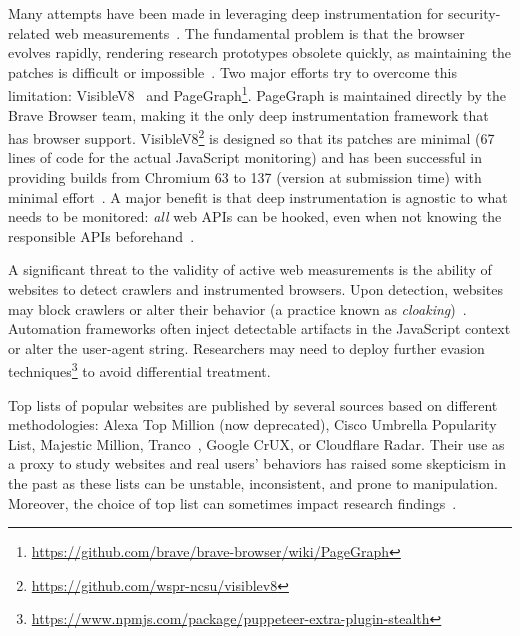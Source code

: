  Many attempts have been made in leveraging deep instrumentation for security-related web measurements~\cite{neasbittWebCapsuleLightweightForensic2015,liJSgraphEnablingReconstruction2018, acarFPDetectiveDustingWeb2013, IncontextStoreIncontext1998, chenMystiqueUncoveringInformation2018}. The fundamental problem is that the browser evolves rapidly, rendering research prototypes obsolete quickly, as maintaining the patches is difficult or impossible~\cite{chenMystiqueUncoveringInformation2018}.  
Two major efforts try to overcome this limitation: VisibleV8~\cite{jueckstockVisibleV8InbrowserMonitoring2019} and PageGraph\footnote{\url{https://github.com/brave/brave-browser/wiki/PageGraph}}.
%
PageGraph is maintained directly by the Brave Browser team, making it the only deep instrumentation framework that has browser support. 
%
VisibleV8\footnote{\url{https://github.com/wspr-ncsu/visiblev8}} is designed so that its patches are minimal (67 lines of code for the actual JavaScript monitoring) and has been successful in providing builds from Chromium 63 to 137 (version at submission time) with minimal effort~\cite{ jueckstockVisibleV8InbrowserMonitoring2019}. A major benefit is that deep instrumentation is agnostic to what needs to be monitored: \textit{all} web APIs can be hooked, even when not knowing the responsible APIs beforehand~\cite{suAutomaticDiscoveryEmerging2023}.

A significant threat to the validity of active web measurements is the ability of websites to detect crawlers and instrumented browsers. Upon detection, websites may block crawlers or alter their behavior (a practice known as \textit{cloaking})~\cite{invernizzi2016cloak}. Automation frameworks often inject detectable artifacts in the JavaScript context or alter the user-agent string. Researchers may need to deploy further evasion techniques\footnote{\url{https://www.npmjs.com/package/puppeteer-extra-plugin-stealth}} to avoid differential treatment.

 Top lists of popular websites are published by several sources based on different methodologies: Alexa Top Million (now deprecated), Cisco Umbrella Popularity List, Majestic Million, Tranco~\cite{lepochatTrancoResearchOrientedTop2019}, Google CrUX, or Cloudflare Radar. 
%
Their use as a proxy to study websites and real users' behaviors has raised some skepticism in the past as these lists can be unstable, inconsistent, and prone to manipulation. Moreover, the choice of top list can sometimes impact research findings~\cite{lepochatTrancoResearchOrientedTop2019,ruthTopplingTopLists2022}.

